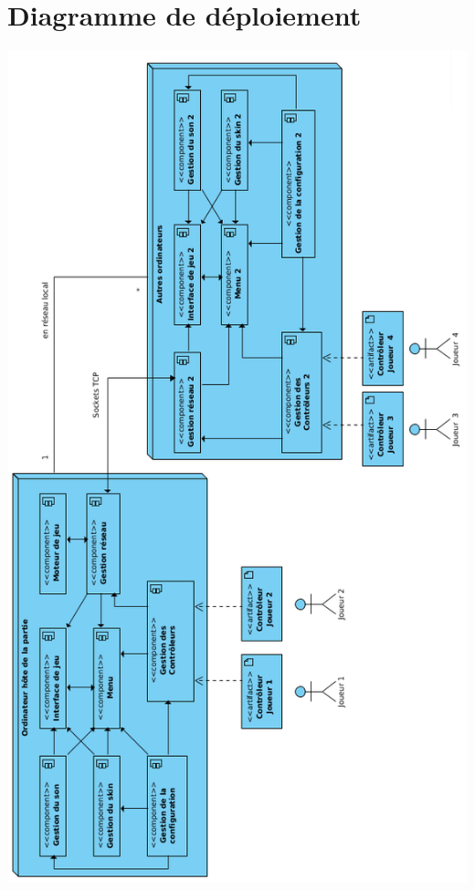 \section{Diagramme de déploiement}

\begin{center}
\includegraphics[scale=0.62]{images/UML/deploiement.png}
\end{center}